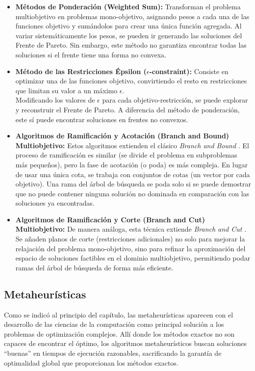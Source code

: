 \documentclass[12pt,a4paper]{book}
\begin{document}
\begin{itemize}
    \item \textbf{Métodos de Ponderación (Weighted Sum):} Transforman el problema multiobjetivo en problemas mono-objetivo, asignando pesos a cada una de las funciones objetivo y sumándolos para crear una única función agregada. Al variar sistemáticamente los pesos, se pueden ir generando las soluciones del Frente de Pareto. Sin embargo, este método no garantiza encontrar todas las soluciones si el frente tiene una forma no convexa.

    \item \textbf{Método de las Restricciones Épsilon ($\epsilon$-constraint):} Consiste en optimizar una de las funciones objetivo, convirtiendo el resto en restricciones que limitan su valor a un máximo $\epsilon$.\\
    Modificando los valores de $\epsilon$ para cada objetivo-restricción, se puede explorar y reconstruir el Frente de Pareto. A diferencia del método de ponderación, este sí puede encontrar soluciones en frentes no convexos.

    \item \textbf{Algoritmos de Ramificación y Acotación (Branch and Bound) Multiobjetivo:} Estos algoritmos extienden el clásico \textit{Branch and Bound} \cite{bnb}. El proceso de ramificación es similar (se divide el problema en subproblemas más pequeños), pero la fase de acotación (o poda) es más compleja. En lugar de usar una única cota, se trabaja con conjuntos de cotas (un vector por cada objetivo). Una rama del árbol de búsqueda se poda solo si se puede demostrar que no puede contener ninguna solución no dominada en comparación con las soluciones ya encontradas.

    \item \textbf{Algoritmos de Ramificación y Corte (Branch and Cut) Multiobjetivo:} De manera análoga, esta técnica extiende \textit{Branch and Cut} \cite{bnc}. Se añaden planos de corte (restricciones adicionales) no solo para mejorar la relajación del problema mono-objetivo, sino para refinar la aproximación del espacio de soluciones factibles en el dominio multiobjetivo, permitiendo podar ramas del árbol de búsqueda de forma más eficiente.
\end{itemize}

\subsection{Metaheurísticas}
Como se indicó al principio del capítulo, las metaheurísticas \cite{metaheuristicos} aparecen con el desarrollo de las ciencias de la computación como principal solución a los problemas de optimización complejos. Allí donde los métodos exactos no son capaces de encontrar el óptimo,
los algoritmos metaheurísticos buscan soluciones ``buenas'' en tiempos de ejecución razonables, sacrificando la garantía de optimalidad global que proporcionan los métodos exactos.
\end{document}
